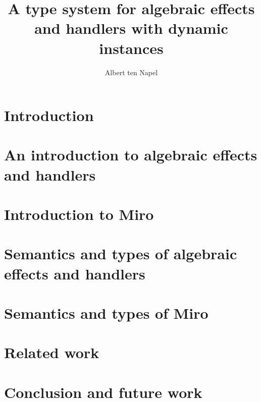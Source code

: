 \documentclass[12pt]{book}
\title{A type system for algebraic effects and handlers with dynamic instances}
\author{Albert ten Napel}
\date{}
\newcommand{\lang}{Miro}
\begin{document}
\maketitle

\tableofcontents
\newpage

\chapter{Introduction}


\chapter[Algebraic effects introduction]{An introduction to algebraic effects and handlers}


\chapter{Introduction to \lang{}}


\chapter[Algebraic effects theory]{Semantics and types of algebraic effects and handlers}


\chapter{Semantics and types of \lang{}}


\chapter{Related work}


\chapter{Conclusion and future work}

% 
\end{document}
